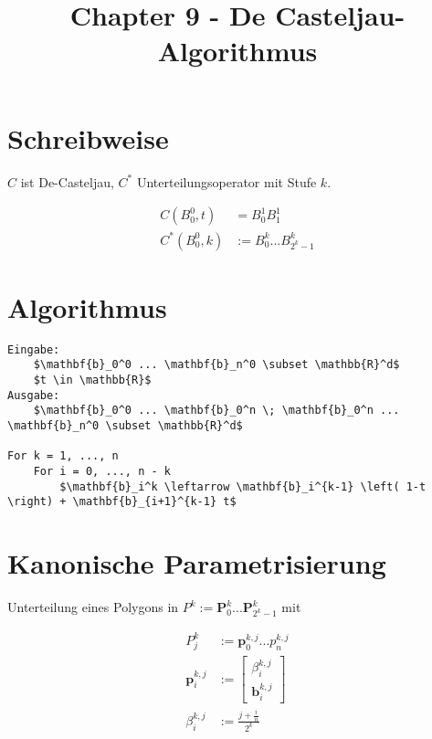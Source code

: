 \documentclass[8pt, DIV15, twocolumn]{scrartcl}
\title{Chapter 9 - De Casteljau-Algorithmus}
\date{}
\begin{document}
\setlength{\abovedisplayskip}{0pt}
\setlength{\belowdisplayskip}{0pt}
\setlength{\parskip}{0pt}
\setlength{\topmargin}{0pt}

 
\maketitle

\thispagestyle{empty}

\section*{Schreibweise}

$C$ ist De-Casteljau, $C^*$ Unterteilungsoperator mit Stufe $k$.

\begin{equation*}
\begin{aligned}
C \left( B_0^0, t \right) &= B_0^1 B_1^1 \\
C^* \left( B_0^0, k \right) &:= B_0^k ... B_{2^k - 1}^k 
\end{aligned}
\end{equation*}

\section*{Algorithmus}

\begin{lstlisting}[mathescape=true]
Eingabe:
	$\mathbf{b}_0^0 ... \mathbf{b}_n^0 \subset \mathbb{R}^d$
	$t \in \mathbb{R}$
Ausgabe:
	$\mathbf{b}_0^0 ... \mathbf{b}_0^n \; \mathbf{b}_0^n ... \mathbf{b}_n^0 \subset \mathbb{R}^d$

For k = 1, ..., n
	For i = 0, ..., n - k
		$\mathbf{b}_i^k \leftarrow \mathbf{b}_i^{k-1} \left( 1-t \right) + \mathbf{b}_{i+1}^{k-1} t$
\end{lstlisting}


\section*{Kanonische Parametrisierung}
Unterteilung eines Polygons in $P^k := \mathbf{P}_0^k ... \mathbf{P}_{2^k - 1}^k$ mit 

\begin{equation*}
\begin{aligned}
P_j^k &:= \mathbf{p}_0^{k,j} ... p_n^{k,j} \\
\mathbf{p}_i^{k,j} &:= 
\begin{bmatrix}
\beta_i^{k,j} \\
\mathbf{b}_i^{k,j}
\end{bmatrix} \\
\beta_i^{k,j} &:= \frac{j + \frac{i}{n}}{2^k}
\end{aligned}
\end{equation*}
\end{document}
